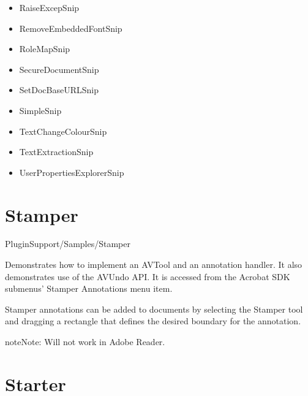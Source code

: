 \documentclass[letterpaper,12pt,english,openany,oneside]{sphinxmanual}
\begin{document}
\begin{itemize}
\item {} 
RaiseExcepSnip

\item {} 
RemoveEmbeddedFontSnip

\item {} 
RoleMapSnip

\item {} 
SecureDocumentSnip

\item {} 
SetDocBaseURLSnip

\item {} 
SimpleSnip

\item {} 
TextChangeColourSnip

\item {} 
TextExtractionSnip

\item {} 
UserPropertiesExplorerSnip

\end{itemize}


\section{Stamper}
\label{\detokenize{Samples_Plug_in:stamper}}\label{\detokenize{Samples_Plug_in:location-10}}

PluginSupport/Samples/Stamper

\label{\detokenize{Samples_Plug_in:description-11}}

Demonstrates how to implement an AVTool and an annotation handler. It also demonstrates use of the AVUndo API. It is accessed from the Acrobat SDK submenus’ Stamper Annotations menu item.

\label{\detokenize{Samples_Plug_in:usage-9}}

Stamper annotations can be added to documents by selecting the Stamper tool and dragging a rectangle that defines the desired boundary for the annotation.

\begin{sphinxadmonition}{note}{Note:}
Will not work in Adobe Reader.
\end{sphinxadmonition}


\section{Starter}
\label{\detokenize{Samples_Plug_in:starter}}\label{\detokenize{Samples_Plug_in:location-11}}
\end{document}
